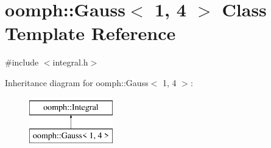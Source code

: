 \hypertarget{classoomph_1_1Gauss_3_011_00_014_01_4}{}\section{oomph\+:\+:Gauss$<$ 1, 4 $>$ Class Template Reference}
\label{classoomph_1_1Gauss_3_011_00_014_01_4}


{\ttfamily \#include $<$integral.\+h$>$}

Inheritance diagram for oomph\+:\+:Gauss$<$ 1, 4 $>$\+:\begin{figure}[H]
\begin{center}
\leavevmode
\includegraphics[height=2.000000cm]{classoomph_1_1Gauss_3_011_00_014_01_4}
\end{center}
\end{figure}
